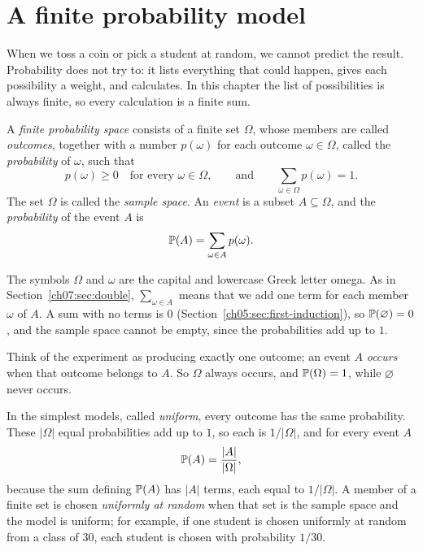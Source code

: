 \section{A finite probability model}\label{ch13:sec:model}
When we toss a coin or pick a student at random, we cannot predict the result. Probability does not try to: it lists everything that could happen, gives each possibility a weight, and calculates. In this chapter the list of possibilities is always finite, so every calculation is a finite sum.

\par\noindent\begin{minipage}{\linewidth}
\begin{definition}\label{ch13:def:space}
A \emph{finite probability space} consists of a finite set $\Omega$, whose members are called \emph{outcomes}, together with a number $p(\omega)$ for each outcome $\omega\in\Omega$, called the \emph{probability} of $\omega$, such that
\[
p(\omega)\ge0\quad\text{for every }\omega\in\Omega,\qquad\text{and}\qquad\sum_{\omega\in\Omega}p(\omega)=1.
\]
The set $\Omega$ is called the \emph{sample space}. An \emph{event} is a subset $A\subseteq\Omega$, and the \emph{probability} of the event $A$ is
\[
\operatorname{\mathbb P}(A)=\sum_{\omega\in A}p(\omega).
\]
\end{definition}
\end{minipage}\par

The symbols $\Omega$ and $\omega$ are the capital and lowercase Greek letter omega. As in Section~\ref{ch07:sec:double}, $\sum_{\omega\in A}$ means that we add one term for each member $\omega$ of $A$. A sum with no terms is $0$ (Section~\ref{ch05:sec:first-induction}), so $\operatorname{\mathbb P}(\varnothing)=0$, and the sample space cannot be empty, since the probabilities add up to $1$.

Think of the experiment as producing exactly one outcome; an event $A$ \emph{occurs} when that outcome belongs to $A$. So $\Omega$ always occurs, and $\operatorname{\mathbb P}(\Omega)=1$, while $\varnothing$ never occurs.

In the simplest models, called \emph{uniform}, every outcome has the same probability. These $|\Omega|$ equal probabilities add up to $1$, so each is $1/|\Omega|$, and for every event $A$
\[
\operatorname{\mathbb P}(A)=\frac{|A|}{|\Omega|},
\]
because the sum defining $\operatorname{\mathbb P}(A)$ has $|A|$ terms, each equal to $1/|\Omega|$. A member of a finite set is chosen \emph{uniformly at random} when that set is the sample space and the model is uniform; for example, if one student is chosen uniformly at random from a class of $30$, each student is chosen with probability $1/30$.

